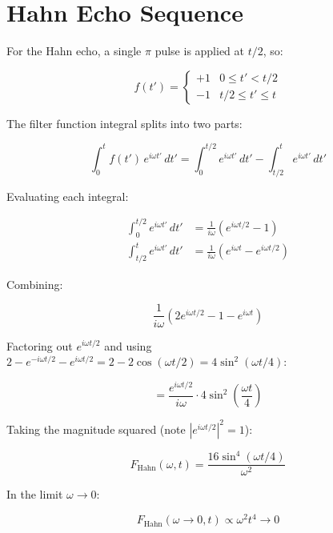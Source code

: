 \documentclass[12pt]{article}
\begin{document}
\section{Hahn Echo Sequence}

For the Hahn echo, a single $\pi$ pulse is applied at $t/2$, so:

\begin{equation}
    f(t') = \begin{cases} +1 & 0 \leq t' < t/2 \\ -1 & t/2 \leq t' \leq t \end{cases}
\end{equation}

The filter function integral splits into two parts:

\begin{equation}
    \int_0^t f(t')\, e^{i\omega t'}\, dt' = \int_0^{t/2} e^{i\omega t'}\, dt' - \int_{t/2}^{t} e^{i\omega t'}\, dt'
\end{equation}

Evaluating each integral:

\begin{align}
    \int_0^{t/2} e^{i\omega t'}\, dt' &= \frac{1}{i\omega}\left(e^{i\omega t/2} - 1\right) \\
    \int_{t/2}^{t} e^{i\omega t'}\, dt' &= \frac{1}{i\omega}\left(e^{i\omega t} - e^{i\omega t/2}\right)
\end{align}

Combining:

\begin{equation}
    \frac{1}{i\omega}\left(2e^{i\omega t/2} - 1 - e^{i\omega t}\right)
\end{equation}

Factoring out $e^{i\omega t/2}$ and using $2 - e^{-i\omega t/2} - e^{i\omega t/2} = 2 - 2\cos(\omega t/2) = 4\sin^2(\omega t/4)$:

\begin{equation}
    = \frac{e^{i\omega t/2}}{i\omega}\cdot 4\sin^2\left(\frac{\omega t}{4}\right)
\end{equation}

Taking the magnitude squared (note $|e^{i\omega t/2}|^2 = 1$):

\begin{equation}
    \boxed{F_\text{Hahn}(\omega, t) = \frac{16\sin^4(\omega t/4)}{\omega^2}}
\end{equation}

In the limit $\omega \to 0$:

\begin{equation}
    F_\text{Hahn}(\omega \to 0, t) \propto \omega^2 t^4 \to 0
\end{equation}
\end{document}
